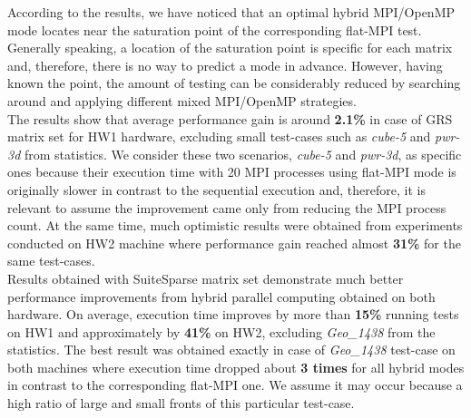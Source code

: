 

According to the results, we have noticed that an optimal hybrid MPI/OpenMP mode locates near the saturation point of the corresponding flat-MPI test. Generally speaking, a location of the saturation point is specific for each matrix and, therefore, there is no way to predict a mode in advance. However, having known the point, the amount of testing can be considerably reduced by searching around and applying different mixed MPI/OpenMP strategies.\\


The results show that average performance gain is around \textbf{2.1\%} in case of GRS matrix set for HW1 hardware, excluding small test-cases such as \textit{cube-5} and \textit{pwr-3d} from statistics. We consider these two scenarios, \textit{cube-5} and \textit{pwr-3d}, as specific ones because their execution time with 20 MPI processes using flat-MPI mode is originally slower in contrast to the sequential execution and, therefore, it is relevant to assume the improvement came only from reducing the MPI process count. At the same time, much optimistic results were obtained from experiments conducted on HW2 machine where performance gain reached almost \textbf{31\%} for the same test-cases.\\



Results obtained with SuiteSparse matrix set demonstrate much better performance improvements from hybrid parallel computing obtained on both hardware. On average, execution time improves by more than \textbf{15\%} running tests on HW1 and approximately by \textbf{41\%} on HW2, excluding \textit{Geo\_1438} from the statistics. The best result was obtained exactly in case of \textit{Geo\_1438} test-case on both machines where execution time dropped about \textbf{3 times} for all hybrid modes in contrast to the corresponding flat-MPI one. We assume it may occur because a high ratio of large and small fronts of this particular test-case.\\


